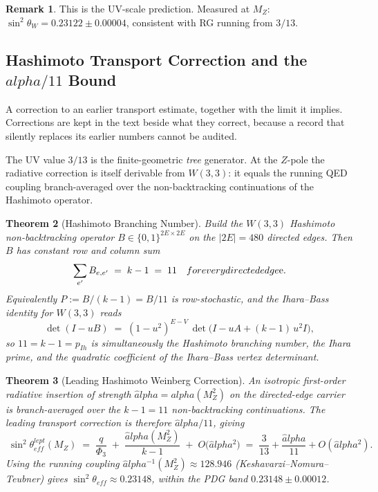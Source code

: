 \documentclass[12pt,a4paper]{article}
\def\mathrm#1{#1}%
\def\text#1{#1}%
\def\alpha{alpha}%
\def\Phi#1{Phi#1}%
\newtheorem{theorem}{Theorem}[section]
\theoremstyle{definition}
\newtheorem{remark}[theorem]{Remark}
\begin{document}
\begin{remark}
This is the UV-scale prediction.  Measured at $M_Z$:
$\sin^2\theta_W = 0.23122\pm 0.00004$, consistent with
RG running from $3/13$.
\end{remark}

\subsection{Hashimoto Transport Correction and the $\alpha/11$ Bound}

\begin{plainbox}
A correction to an earlier transport estimate, together with the limit it implies.
Corrections are kept in the text beside what they correct, because a record that silently
replaces its earlier numbers cannot be audited.
\end{plainbox}

\label{sec:hashimoto-weinberg}

The UV value $3/13$ is the finite-geometric \emph{tree} generator.  At
the $Z$-pole the radiative correction is itself derivable from $W(3,3)$:
it equals the running QED coupling branch-averaged over the
non-backtracking continuations of the Hashimoto operator.

\begin{theorem}[Hashimoto Branching Number]
\label{thm:hashimoto-branching}
Build the $W(3,3)$ Hashimoto non-backtracking operator
$B \in \{0,1\}^{2E\times 2E}$ on the $|2E| = 480$ directed edges.
Then $B$ has constant row and column sum
\[
\sum_{e'} B_{e,e'} \;=\; k - 1 \;=\; 11 \quad\text{for every directed edge $e$.}
\]
Equivalently $P := B/(k-1) = B/11$ is row-stochastic, and the
Ihara--Bass identity for $W(3,3)$ reads
\[
\det(I - u B) \;=\; (1-u^2)^{E-V}\,\det\!\bigl(I - uA + (k-1)\,u^2 I\bigr),
\]
so $11 = k - 1 = p_{\mathrm{Ih}}$ is simultaneously the Hashimoto
branching number, the Ihara prime, and the quadratic coefficient of
the Ihara--Bass vertex determinant.
\end{theorem}

\begin{theorem}[Leading Hashimoto Weinberg Correction]
\label{thm:hashimoto-weinberg}
An isotropic first-order radiative insertion of strength
$\hat\alpha = \alpha(M_Z^2)$ on the directed-edge carrier is
branch-averaged over the $k-1 = 11$ non-backtracking continuations.
The leading transport correction is therefore $\hat\alpha/11$, giving
\begin{equation}
\boxed{\;
\sin^2\theta_{\mathrm{eff}}^{\mathrm{lept}}(M_Z)
\;=\; \frac{q}{\Phi_3} \;+\; \frac{\hat\alpha(M_Z^2)}{k-1}
\;+\; O\!\bigl(\hat\alpha^2\bigr)
\;=\; \frac{3}{13} + \frac{\hat\alpha}{11} + O(\hat\alpha^2).
\;}
\end{equation}
Using the running coupling $\hat\alpha^{-1}(M_Z^2) \approx 128.946$
(Keshavarzi--Nomura--Teubner) gives
$\sin^2\theta_{\mathrm{eff}} \approx 0.23148$, within the PDG band
$0.23148 \pm 0.00012$.
\end{theorem}
\end{document}
